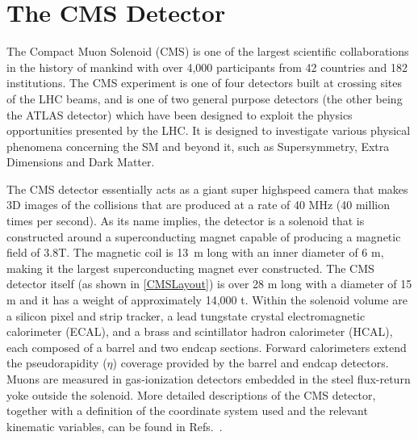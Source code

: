 \chapter{The CMS Detector\label{ch:CMS}}

The Compact Muon Solenoid (CMS) is one of the largest scientific collaborations in the history of mankind with over 4,000 participants from 42 countries and 182 institutions.
The CMS experiment is one of four detectors built at crossing sites of the LHC beams, and is one of two general purpose detectors (the other being the ATLAS detector) which have been designed to exploit the physics opportunities presented by the LHC.
It is designed to investigate various physical phenomena concerning the SM and beyond it, such as Supersymmetry, Extra Dimensions and Dark Matter.

The CMS detector essentially acts as a giant super highspeed camera that makes 3D images of the collisions that are produced at a rate of 40 MHz (40 million times per second).
As its name implies, the detector is a solenoid that is constructed around a superconducting magnet capable of producing a magnetic field of 3.8\unit{\tesla}.
The magnetic coil is 13~m long with an inner diameter of 6 m, making it the largest superconducting magnet ever constructed.
The CMS detector itself  (as shown in \autoref{CMSLayout}) is over 28 m long with a diameter of 15 m and it has a weight of approximately 14,000 \unit{\tonne}.
Within the solenoid volume are a silicon pixel and strip tracker, a lead tungstate crystal electromagnetic calorimeter (ECAL), and a brass and scintillator hadron calorimeter (HCAL), each composed of a barrel and two endcap sections. Forward calorimeters extend the pseudorapidity ($\eta$) coverage provided by the barrel and endcap detectors. Muons are measured in gas-ionization detectors embedded in the steel flux-return yoke outside the solenoid. More detailed descriptions of the CMS detector, together with a definition of the coordinate system used and the relevant kinematic variables, can be found in Refs.~\cite{CMS:2008xjf,CMS:2023gfb}.




